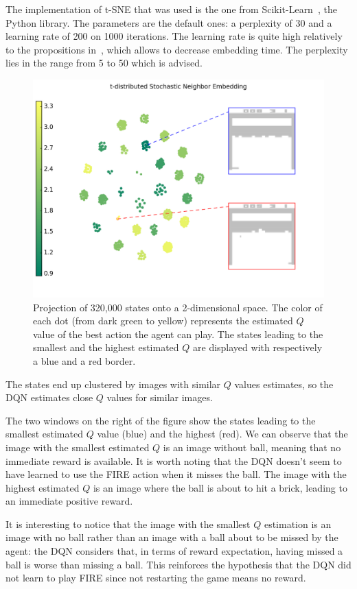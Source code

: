 \documentclass[letterpaper]{article}
\begin{document}
The implementation of t-SNE that was used is the one from Scikit-Learn~\citep{scikit-learn}, the Python library. The parameters are the default ones:
a perplexity of 30 and a learning rate of 200 on 1000 iterations. The learning rate is quite high relatively to the propositions in~\cite{wattenberg2016how},
which allows to decrease embedding time. The perplexity lies in the range from 5 to 50 which is advised.

\begin{figure}[!h]
	\includegraphics[width=.5\textwidth]{figures/TSNE_dqn_uniform}
	\caption{Projection of 320,000 states onto a 2-dimensional space. The color of each dot (from dark green to yellow) represents the estimated $Q$ value of the
	best action the agent can play. The states leading to the smallest and the highest estimated $Q$ are displayed with respectively a blue and a red border.
	\label{fig:t-SNE DQN uniform}}
\end{figure}

The states end up clustered by images with similar $Q$ values estimates, so the DQN estimates close $Q$ values for similar images.

The two windows on the right of the figure show the states leading to the smallest estimated $Q$ value (blue) and the highest (red).
We can observe that the image with the smallest estimated $Q$ is an image without ball, meaning that no immediate reward is available. It
is worth noting that the DQN doesn't seem to have learned to use the FIRE action when it misses the ball. The image with the highest estimated
$Q$ is an image where the ball is about to hit a brick, leading to an immediate positive reward.

It is interesting to notice that the image with the smallest $Q$ estimation is an image with no ball rather than an image with a ball about
to be missed by the agent: the DQN considers that, in terms of reward expectation, having missed a ball is worse than missing a ball. This
reinforces the hypothesis that the DQN did not learn to play FIRE since not restarting the game means no reward.
\end{document}
